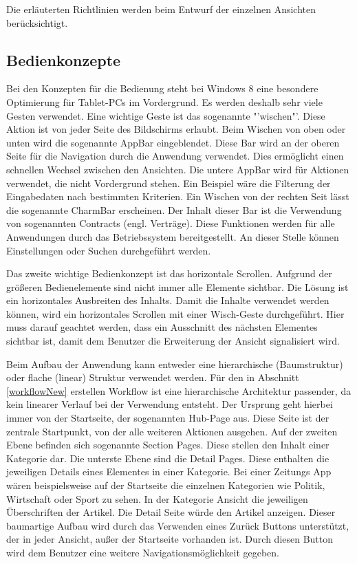 Die erläuterten Richtlinien werden beim Entwurf der einzelnen Ansichten berücksichtigt. 


\subsection{Bedienkonzepte}\label{usingConcepts}
Bei den Konzepten für die Bedienung steht bei Windows 8 eine besondere Optimierung für Tablet-PCs im Vordergrund. Es werden deshalb sehr viele Gesten verwendet. Eine wichtige Geste ist das sogenannte "'wischen"'. Diese Aktion ist von jeder Seite des Bildschirms erlaubt. Beim Wischen von oben oder unten wird die sogenannte AppBar eingeblendet. Diese Bar wird an der oberen Seite für die Navigation durch die Anwendung verwendet. Dies ermöglicht einen schnellen Wechsel zwischen den Ansichten. Die untere AppBar wird für Aktionen verwendet, die nicht Vordergrund stehen. Ein Beispiel wäre die Filterung der Eingabedaten nach bestimmten Kriterien. Ein Wischen von der rechten Seit lässt die sogenannte CharmBar erscheinen. Der Inhalt dieser Bar ist die Verwendung von sogenannten Contracts (engl. Verträge). Diese Funktionen werden für alle Anwendungen durch das Betriebssystem bereitgestellt. An dieser Stelle können Einstellungen oder Suchen durchgeführt werden. \par 

Das zweite wichtige Bedienkonzept ist das horizontale Scrollen. Aufgrund der größeren Bedienelemente sind nicht immer alle Elemente sichtbar. Die Lösung ist ein horizontales Ausbreiten des Inhalts. Damit die Inhalte verwendet werden können, wird ein horizontales Scrollen mit einer Wisch-Geste durchgeführt. Hier muss darauf geachtet werden, dass ein Ausschnitt des nächsten Elementes sichtbar ist, damit dem Benutzer die Erweiterung der Ansicht signalisiert wird. \par 

Beim Aufbau der Anwendung kann entweder eine hierarchische (Baumstruktur) oder  flache (linear) Struktur verwendet werden. Für den in Abschnitt \ref{workflowNew} erstellen Workflow ist eine hierarchische Architektur passender, da kein linearer Verlauf bei der Verwendung entsteht. Der Ursprung geht hierbei immer von der Startseite, der sogenannten Hub-Page aus. Diese Seite ist der zentrale Startpunkt, von der alle weiteren Aktionen ausgehen. Auf der zweiten Ebene befinden sich sogenannte Section Pages. Diese stellen den Inhalt einer  Kategorie dar. Die unterste Ebene sind die Detail Pages. Diese enthalten die jeweiligen Details eines Elementes in einer Kategorie. Bei einer Zeitungs App wären beispielsweise auf der Startseite die einzelnen Kategorien wie Politik, Wirtschaft oder Sport zu sehen. In der Kategorie Ansicht die jeweiligen Überschriften der Artikel. Die Detail Seite würde den Artikel anzeigen. Dieser baumartige Aufbau wird durch das Verwenden eines Zurück Buttons unterstützt, der in jeder Ansicht, außer der Startseite vorhanden ist. Durch diesen Button wird dem Benutzer eine weitere Navigationsmöglichkeit gegeben.

